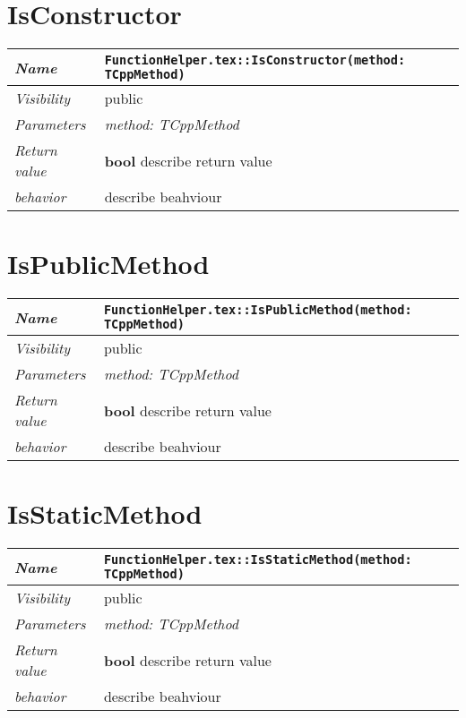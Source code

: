  \section{IsConstructor}
\begin{longtable}{p{3cm} @{\hskip 1cm} p{12cm}}
 \hline
\textit{Name} & \texttt{FunctionHelper.tex::IsConstructor(method: TCppMethod)}\\
\hline
 \textit{Visibility} & public\\
\hline
\textit{Parameters} & \textit{method: TCppMethod}\\
\hline
\textit{Return value} & \textbf{ bool} describe return value\\
  \hline
 \textit{behavior} & describe beahviour \\
\hline
\end{longtable} \pagebreak
 \section{IsPublicMethod}
\begin{longtable}{p{3cm} @{\hskip 1cm} p{12cm}}
 \hline
\textit{Name} & \texttt{FunctionHelper.tex::IsPublicMethod(method: TCppMethod)}\\
\hline
 \textit{Visibility} & public\\
\hline
\textit{Parameters} & \textit{method: TCppMethod}\\
\hline
\textit{Return value} & \textbf{ bool} describe return value\\
  \hline
 \textit{behavior} & describe beahviour \\
\hline
\end{longtable} \pagebreak
 \section{IsStaticMethod}
\begin{longtable}{p{3cm} @{\hskip 1cm} p{12cm}}
 \hline
\textit{Name} & \texttt{FunctionHelper.tex::IsStaticMethod(method: TCppMethod)}\\
\hline
 \textit{Visibility} & public\\
\hline
\textit{Parameters} & \textit{method: TCppMethod}\\
\hline
\textit{Return value} & \textbf{ bool} describe return value\\
  \hline
 \textit{behavior} & describe beahviour \\
\hline
\end{longtable} \pagebreak
